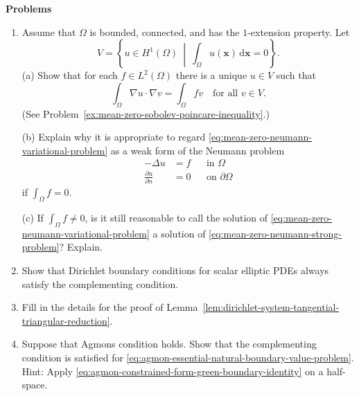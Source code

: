 \textbf{Problems}

\begin{enumerate}[label=\thesection.\arabic*.,ref=\thesection.\arabic*,start=5,series=book-problems]

\item\label{ex:mean-zero-neumann-variational-compatibility} Assume that $\Omega$ is bounded, connected, and has the $1$-extension property. Let\[V=\left\{u\in H^1(\Omega)\ \middle|\ \int_\Omega u(\bm{x})\,\mathrm{d}\bm{x}=0\right\}.\](a) Show that for each $f\in L^2(\Omega)$ there is a unique $u\in V$ such that
\begin{equation}\label{eq:mean-zero-neumann-variational-problem}
\int_\Omega\nabla u\cdot\nabla v=\int_\Omega fv\quad\text{for all }v\in V.
\end{equation}
(See Problem~\ref{ex:mean-zero-sobolev-poincare-inequality}.)

(b) Explain why it is appropriate to regard \eqref{eq:mean-zero-neumann-variational-problem} as a weak form of the Neumann problem
\begin{equation}\label{eq:mean-zero-neumann-strong-problem}
\begin{aligned}
-\Delta u&=f&&\text{in }\Omega\\
\frac{\partial u}{\partial n}&=0&&\text{on }\partial\Omega
\end{aligned}
\end{equation}
if $\int_\Omega f=0$.

(c) If $\int_\Omega f\ne0$, is it still reasonable to call the solution of \eqref{eq:mean-zero-neumann-variational-problem} a solution of \eqref{eq:mean-zero-neumann-strong-problem}? Explain.

\item\label{ex:scalar-dirichlet-complementing-condition} Show that Dirichlet boundary conditions for scalar elliptic PDEs always satisfy the complementing condition.

\item\label{ex:dirichlet-system-triangular-reduction-details} Fill in the details for the proof of Lemma~\ref{lem:dirichlet-system-tangential-triangular-reduction}.

\item\label{ex:agmon-condition-implies-complementing-natural-boundaries} Suppose that Agmon\textquotesingle s condition holds. Show that the complementing condition is satisfied for \eqref{eq:agmon-essential-natural-boundary-value-problem}. Hint: Apply \eqref{eq:agmon-constrained-form-green-boundary-identity} on a half-space.


\end{enumerate}
